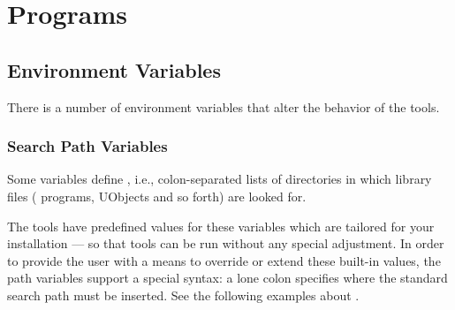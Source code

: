 \newcommand{\optionDebug}{
  Set the verbosity level of traces.
  This option is mostly for developers, but it is very useful when
  tracking problems such as a UObject that fails to load properly.
  Valid values for \var{level} are, in increasing verbosity order:
  \begin{sublist}
    \begin{enumerate}
    \item \code{NONE}, no log messages at all.
    \item \code{LOG}, the default value.
    \item \code{TRACE}
    \item \code{DEBUG}
    \item \code{DUMP}, maximum verbosity.
    \end{enumerate}
  \end{sublist}
}
\newcommand{\optionHelp}
  {Display the help message and exit successfully.}

\newcommand{\optionVersion}
  {Display version information and exit successfully.}

\chapter{Programs}
\label{sec:tools}

\section{Environment Variables}
\label{sec:tools:envvars}

There is a number of environment variables that alter the behavior of
the \urbi tools.

\subsection{Search Path Variables}

Some variables define , i.e.,
colon-separated lists of directories in which library files (\us
programs, UObjects and so forth) are looked for.

The tools have predefined values for these variables which are
tailored for your installation --- so that \urbi tools can be run
without any special adjustment.  In order to provide the user with a
means to override or extend these built-in values, the path variables
support a special syntax: a lone colon specifies where the standard
search path must be inserted.  See the following examples about
.

